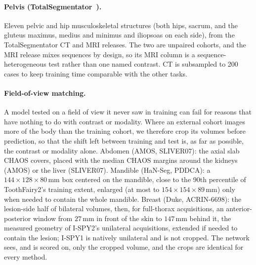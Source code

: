 \paragraph{Pelvis (TotalSegmentator~\cite{wasserthal2023totalseg,dantonoli2025totalsegmri}).}
Eleven pelvic and hip musculoskeletal structures (both hips, sacrum, and the
gluteus maximus, medius and minimus and iliopsoas on each side), from the
TotalSegmentator CT and MRI releases. The two are
unpaired cohorts, and the MRI release mixes sequences by design, so its MRI
column is a sequence-heterogeneous test rather than one named contrast. CT is
subsampled to 200 cases to keep training time comparable with the other tasks.

\paragraph{Field-of-view matching.} A model tested on a field of view it never
saw in training can fail for reasons that have nothing to do with contrast or
modality. Where an external cohort images more of the body than the training
cohort, we therefore crop its volumes before prediction, so that the shift
left between training and test is, as far as possible, the contrast or
modality alone. Abdomen (AMOS, SLIVER07): the axial slab CHAOS covers, placed
with the median CHAOS margins around the kidneys (AMOS) or the liver
(SLIVER07). Mandible (HaN-Seg, PDDCA): a $144\times128\times80$\,mm box centered
on the mandible, close to the 90th percentile of ToothFairy2's training
extent, enlarged (at most to $154\times154\times89$\,mm) only when needed to
contain the whole mandible. Breast (Duke, ACRIN-6698): the lesion-side
half of bilateral volumes, then, for full-thorax acquisitions, an
anterior-posterior window from $27$\,mm in front of the skin to $147$\,mm
behind it, the measured geometry of I-SPY2's unilateral acquisitions, extended
if needed to contain the lesion; I-SPY1 is natively unilateral and is not
cropped. The network sees, and is scored on, only the cropped volume, and the
crops are identical for every method.

